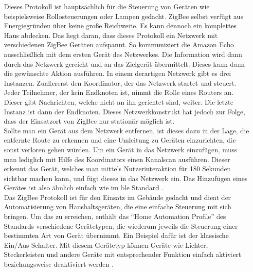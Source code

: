 \noindent Dieses Protokoll ist hauptsächlich für die Steuerung von Geräten wie beispielsweise Rollosteuerungen oder Lampen gedacht. ZigBee selbst verfügt aus Energiegründen über keine große Reichweite. Es kann dennoch ein komplettes Haus abdecken. Das liegt daran, dass dieses Protokoll ein Netzwerk mit verschiedenen ZigBee Geräten aufspannt. So kommuniziert die Amazon Echo ausschließlich mit dem ersten Gerät des Netzwerkes. Die Information wird dann durch das Netzwerk gereicht und an das Zielgerät übermittelt. Dieses kann dann die gewünschte Aktion ausführen. In einem derartigen Netzwerk gibt es drei Instanzen. Zuallererst den Koordinator, der das Netzwerk startet und steuert. Jeder Teilnehmer, der kein Endknoten ist, nimmt die Rolle eines Routers an. Dieser gibt Nachrichten, welche nicht an ihn gerichtet sind, weiter. Die letzte Instanz ist dann der Endknoten. Dieses Netzwerkkonstrukt hat jedoch zur Folge, dass der Einsatzort von ZigBee nur stationär möglich ist.\\

\noindent Sollte man ein Gerät aus dem Netzwerk entfernen, ist dieses dazu in der Lage, die entfernte Route zu erkennen und eine Umleitung zu Geräten einzurichten, die sonst verloren gehen würden. Um ein Gerät in das Netzwerk einzufügen, muss man lediglich mit Hilfe des Koordinators einen Kanalscan ausführen. Dieser erkennt das Gerät, welches man mittels Nutzerinteraktion für 180 Sekunden sichtbar machen kann, und fügt dieses in das Netzwerk ein. Das Hinzufügen eines Gerätes ist also ähnlich einfach wie im \ac{ble} Standard \cite{ZA:Zig}.\\

\noindent Das ZigBee Protokoll ist für den Einsatz im Gebäude gedacht und dient der Automatisierung von Haushaltsgeräten, die eine einfache Steuerung mit sich bringen. Um das zu erreichen, enthält das "`Home Automation Profile"' des Standards verschiedene Gerätetypen, die wiederum jeweils die Steuerung einer bestimmten Art von Gerät übernimmt. Ein Beispiel dafür ist der klassische Ein/Aus Schalter. Mit diesem Gerätetyp können Geräte wie Lichter, Steckerleisten und andere Geräte mit entsprechender Funktion einfach aktiviert beziehungsweise deaktiviert werden \cite[Seite 231]{Gessler14:WNN}.\\

